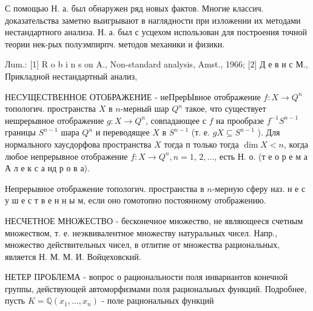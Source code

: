 \documentclass[10pt]{article}
\begin{document}
С помощью Н. а. был обнаружен ряд новых фактов. Многие классич. доказательства заметно выигрывают в наглядности при изложении их методами нестандартного анализа. Н. а. был с усцехом использован для построения точной теории нек-рых полуэмпирпч. методов механики и физики.



Лum.: [1] R o b i n s on A., Non-standard analysis, Amst., 1966; [2] Д е в и с М., Прикладной нестандартный анализ,



НЕСУЩЕСТВЕННОЕ ОТОБРАЖЕНИЕ - неПрерЫвное отображение $f: X \rightarrow Q^{n}$ топологич. пространства $X$ в $n$-мерный шар $Q^{n}$ такое, что существует нешрерывное отображение $g: X \rightarrow Q^{n}$, совпадающее с $f$ на прообразе $f^{-1} S^{n-1}$ границы $S^{n-1}$ шара $Q^{n}$ и переводящее $X$ в $S^{n-1}$ (т. е. $g X \subseteq S^{n-1}$ ). Для нормального хаусдорфова пространства $X$ тогда п только тогда $\operatorname{dim} X<n$, когда любое непрерывное отображение $f: X \rightarrow Q^{n}, n=1$, $2, \ldots$, есть Н. о. (т е о р е м а А л е к с а нд р о в а).



Непрерывное отображение топологич. пространства в $n$-мерную сферу наз. н е с у ш е с т в е н н ы м, если оно гомотопно постоянному отображению.



НЕСЧЕТНОЕ МНОЖЕСТВО - бесконечное множество, не являющееся счетным множеством, т. е. неэквивалентное множеству натуральных чисел. Напр., множество действительных чисел, в отлитие от множества рациональных, является Н. М. М. И. Войцеховский.



НЕТЕР ПРОБЛЕМА - вопрос о рациональности поля инвариантов конечной группы, действующей автоморфизмами поля рациональных функций. Подробнее, пусть $K=\mathbb{Q}\left(x_{1}, \ldots, x_{n}\right)$ - поле рациональных функций
\end{document}

